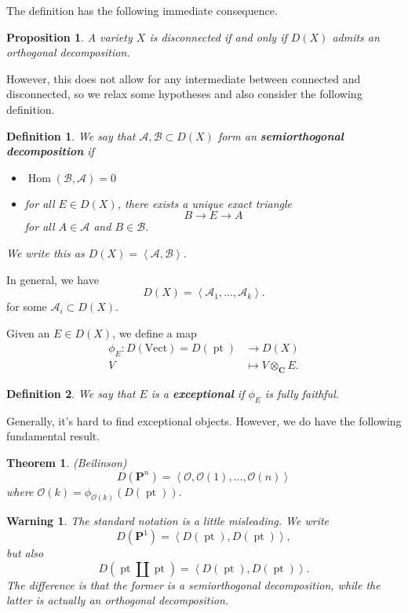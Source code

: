 \documentclass{amsart}
\newtheorem*{thm}{Theorem}
\newtheorem*{defn}{Definition}
\newtheorem*{prop}{Proposition}
\newtheorem*{warn}{Warning}
\newcommand{\A}{\mathcal{A}}
\newcommand{\B}{\mathcal{B}}
\newcommand{\CC}{\textbf{C}}
\newcommand{\PP}{\textbf{P}}
\newcommand{\Oh}{\mathcal{O}}
\DeclareMathOperator{\Hom}{Hom}
\DeclareMathOperator{\pt}{pt}
\begin{document}
The definition has the following immediate consequence.

\begin{prop}
A variety $X$ is disconnected if and only if $D(X)$ admits an orthogonal decomposition.
\end{prop}

However, this does not allow for any intermediate between connected and disconnected, so we relax some hypotheses and also consider the following definition.

\begin{defn}
We say that $\A, \B \subset D(X)$ form an \textbf{semiorthogonal decomposition} if
\begin{itemize}
  \item{$\Hom(\B, \A) = 0$}
  \item{for all $E \in D(X)$, there exists a unique exact triangle
  \[
  B \to E \to A
  \]
  for all $A \in \A$ and $B \in \B$.}
\end{itemize}
We write this as $D(X) = \left<\A, \B\right>$.
\end{defn}

In general, we have
\[
D(X) = \left<\A_1, \dots, \A_k\right>.
\]
for some $\A_i \subset D(X)$.

Given an $E \in D(X)$, we define a map
\begin{align*}
\phi_E: D(\text{Vect}) = D(\pt) & \to D(X) \\
 V & \mapsto V \otimes_\CC E.
\end{align*}

\begin{defn}
We say that $E$ is a \textbf{exceptional} if $\phi_E$ is fully faithful.
\end{defn}

Generally, it's hard to find exceptional objects. However, we do have the following fundamental result.

\begin{thm}(Beilinson)
\[
D(\PP^n) = \left<\Oh, \Oh(1), \ldots, \Oh(n) \right>
\]
where $\Oh(k) = \phi_{\Oh(k)}(D(\pt))$.
\end{thm}


\begin{warn}
The standard notation is a little misleading.
We write
\[
D(\PP^1) = \left<D(\pt), D(\pt)\right>,
\]
but also
\[
D(\pt \amalg \pt) = \left< D(\pt), D(\pt) \right>.
\]
The difference is that the former is a semiorthogonal decomposition, while the latter is actually an orthogonal decomposition.
\end{warn}
\end{document}

